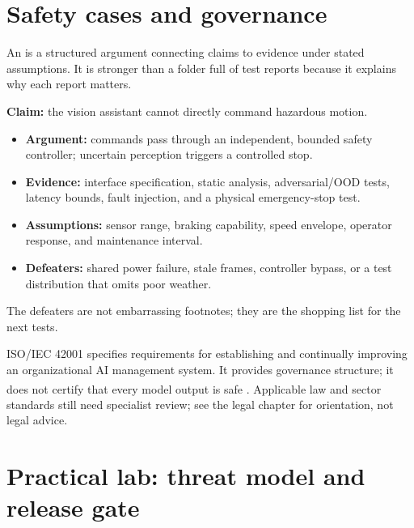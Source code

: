 \section{Safety cases and governance}

An  is a structured argument connecting claims to
evidence under stated assumptions. It is stronger than a folder full of test
reports because it explains why each report matters.

\begin{workedexample}
\textbf{Claim:} the vision assistant cannot directly command hazardous motion.
\begin{itemize}
    \item \textbf{Argument:} commands pass through an independent, bounded
          safety controller; uncertain perception triggers a controlled stop.
    \item \textbf{Evidence:} interface specification, static analysis,
          adversarial/OOD tests, latency bounds, fault injection, and a physical
          emergency-stop test.
    \item \textbf{Assumptions:} sensor range, braking capability, speed
          envelope,
          operator response, and maintenance interval.
    \item \textbf{Defeaters:} shared power failure, stale frames, controller
          bypass, or a test distribution that omits poor weather.
\end{itemize}
The defeaters are not embarrassing footnotes; they are the shopping list for
the next tests.
\end{workedexample}

ISO/IEC 42001 specifies requirements for establishing and continually
improving an organizational AI management system. It provides governance
structure; it does not certify that every model output is safe
\textsuperscript{\cite{isoAIManagementSystems2023}}. Applicable law and sector
standards still need specialist review; see the legal chapter for orientation,
not legal advice.

\section{Practical lab: threat model and release gate}

